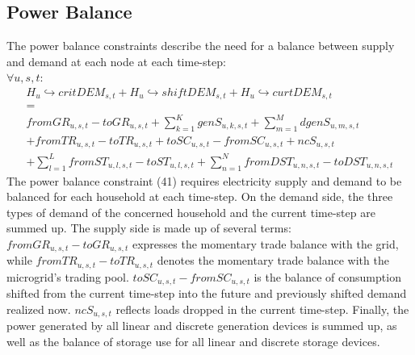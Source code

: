 \documentclass[
	11pt,								%
	DIV10,								%
	a4paper,         					%
	oneside,							%
	headheight=20pt,					%
	footheight=20pt,					%
    parskip=full,						%
    listof=totoc,						%
	bibliography=totoc,					%
	index=totoc,						%
]{scrartcl}
\begin{document}
\subsection{Power Balance}
The power balance constraints describe the need for a balance between supply and demand at each node at each time-step: 
\\
$\forall u,s,t$:
\begin{equation}
	\begin{split}
		H_u\hookrightarrow  critDEM_{s,t} + H_u\hookrightarrow  shiftDEM_{s,t} + H_u\hookrightarrow  curtDEM_{s,t}\\
		= \\
		fromGR_{u,s,t} - toGR_{u,s,t} + \sum_{k=1}^K{genS_{u,k,s,t}} + \sum_{m=1}^M{dgenS_{u,m,s,t}} \\ 
		+ fromTR_{u,s,t} - toTR_{u,s,t} + toSC_{u,s,t} - fromSC_{u,s,t} + ncS_{u,s,t} \\
		+ \sum_{l=1}^L{fromST_{u,l,s,t} - toST_{u,l,s,t}} + \sum_{n=1}^N{fromDST_{u,n,s,t}-toDST_{u,n,s,t}}
	\end{split}
\end{equation}
The power balance constraint (41) requires electricity supply and demand to be balanced for each household at each time-step. On the demand side, the three types of demand of the concerned household and the current time-step are summed up. The supply side is made up of several terms: \\
$fromGR_{u,s,t} - toGR_{u,s,t}$ expresses the momentary trade balance with the grid, while $fromTR_{u,s,t} - toTR_{u,s,t}$ denotes the momentary trade balance with the microgrid's trading pool. $toSC_{u,s,t} - fromSC_{u,s,t}$ is the balance of consumption shifted from the current time-step into the future and previously shifted demand realized now. $ncS_{u,s,t}$ reflects loads dropped in the current time-step. Finally, the power generated by all linear and discrete generation devices is summed up, as well as the balance of storage use for all linear and discrete storage devices. 
\end{document}
